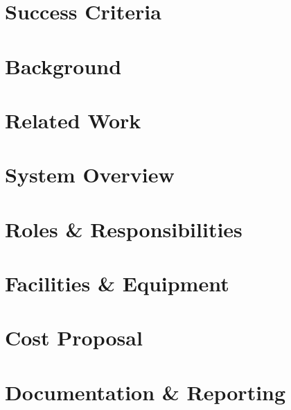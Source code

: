 \documentclass[11pt,letterpaper]{article}
\begin{document}
\section{Success Criteria}

\newpage

\section{Background}

\section{Related Work}

\section{System Overview}

\section{Roles \& Responsibilities}

\section{Facilities \& Equipment}

\section{Cost Proposal}

\section{Documentation \& Reporting}

\newpage



{}


\end{document}
